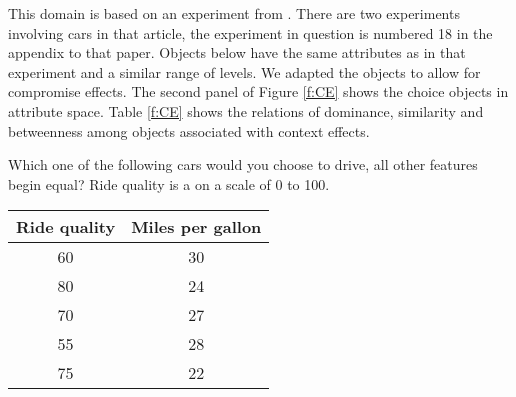 
This domain is based on an experiment from .
There are two experiments involving cars in that article, the experiment in question is  numbered 18 in the appendix to that paper.
Objects below have the same attributes as in that experiment and a similar range of levels.
We adapted the objects to allow for compromise effects.
The second panel of Figure \ref{f:CE} shows the choice objects in attribute space.
Table \ref{f:CE} shows the relations of dominance, similarity and betweenness among objects associated with context effects.

\begin{tcolorbox}
Which one of the following cars would you choose to drive, all other features
begin equal? Ride quality is a on a scale of 0 to 100.

\begin{tabular}{cc}
\hline
Ride quality & Miles per gallon \\ \hline
60 & 30 \\ 
80 & 24 \\ 
70 & 27 \\ 
55 & 28 \\ 
75 & 22 \\ \hline
\end{tabular}
\end{tcolorbox}
